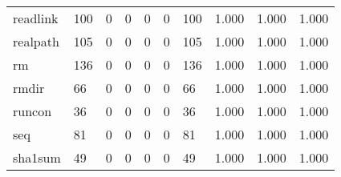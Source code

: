 \begin{longtable}{lp{1.3cm}p{1.3cm}p{1.3cm}p{1.3cm}p{1.3cm}p{1.3cm}p{1.3cm}p{1.3cm}p{1.3cm}}
readlink  &                    100 &                                             0 &                                            0 &                                           0 &                                            0 &                                        100 &                                1.000 &                                  1.000 &                                1.000 \\
realpath  &                    105 &                                             0 &                                            0 &                                           0 &                                            0 &                                        105 &                                1.000 &                                  1.000 &                                1.000 \\
rm        &                    136 &                                             0 &                                            0 &                                           0 &                                            0 &                                        136 &                                1.000 &                                  1.000 &                                1.000 \\
rmdir     &                     66 &                                             0 &                                            0 &                                           0 &                                            0 &                                         66 &                                1.000 &                                  1.000 &                                1.000 \\
runcon    &                     36 &                                             0 &                                            0 &                                           0 &                                            0 &                                         36 &                                1.000 &                                  1.000 &                                1.000 \\
seq       &                     81 &                                             0 &                                            0 &                                           0 &                                            0 &                                         81 &                                1.000 &                                  1.000 &                                1.000 \\
sha1sum   &                     49 &                                             0 &                                            0 &                                           0 &                                            0 &                                         49 &                                1.000 &                                  1.000 &                                1.000 \\

\end{longtable}
